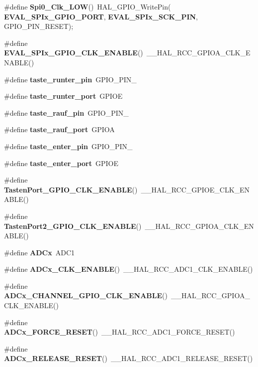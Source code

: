 \begin{DoxyCompactItemize}
\item 
\#define \textbf{ Spi0\+\_\+\+Clk\+\_\+\+L\+OW}()~H\+A\+L\+\_\+\+G\+P\+I\+O\+\_\+\+Write\+Pin(\textbf{ E\+V\+A\+L\+\_\+\+S\+P\+Ix\+\_\+\+G\+P\+I\+O\+\_\+\+P\+O\+RT},\textbf{ E\+V\+A\+L\+\_\+\+S\+P\+Ix\+\_\+\+S\+C\+K\+\_\+\+P\+IN}, G\+P\+I\+O\+\_\+\+P\+I\+N\+\_\+\+R\+E\+S\+ET);
\item 
\#define \textbf{ E\+V\+A\+L\+\_\+\+S\+P\+Ix\+\_\+\+G\+P\+I\+O\+\_\+\+C\+L\+K\+\_\+\+E\+N\+A\+B\+LE}()~\+\_\+\+\_\+\+H\+A\+L\+\_\+\+R\+C\+C\+\_\+\+G\+P\+I\+O\+A\+\_\+\+C\+L\+K\+\_\+\+E\+N\+A\+B\+LE()
\item 
\#define \textbf{ taste\+\_\+runter\+\_\+pin}~G\+P\+I\+O\+\_\+\+P\+I\+N\+\_
\item 
\#define \textbf{ taste\+\_\+runter\+\_\+port}~G\+P\+I\+OE
\item 
\#define \textbf{ taste\+\_\+rauf\+\_\+pin}~G\+P\+I\+O\+\_\+\+P\+I\+N\+\_
\item 
\#define \textbf{ taste\+\_\+rauf\+\_\+port}~G\+P\+I\+OA
\item 
\#define \textbf{ taste\+\_\+enter\+\_\+pin}~G\+P\+I\+O\+\_\+\+P\+I\+N\+\_
\item 
\#define \textbf{ taste\+\_\+enter\+\_\+port}~G\+P\+I\+OE
\item 
\#define \textbf{ Tasten\+Port\+\_\+\+G\+P\+I\+O\+\_\+\+C\+L\+K\+\_\+\+E\+N\+A\+B\+LE}()~\+\_\+\+\_\+\+H\+A\+L\+\_\+\+R\+C\+C\+\_\+\+G\+P\+I\+O\+E\+\_\+\+C\+L\+K\+\_\+\+E\+N\+A\+B\+LE()
\item 
\#define \textbf{ Tasten\+Port2\+\_\+\+G\+P\+I\+O\+\_\+\+C\+L\+K\+\_\+\+E\+N\+A\+B\+LE}()~\+\_\+\+\_\+\+H\+A\+L\+\_\+\+R\+C\+C\+\_\+\+G\+P\+I\+O\+A\+\_\+\+C\+L\+K\+\_\+\+E\+N\+A\+B\+LE()
\item 
\#define \textbf{ A\+D\+Cx}~A\+D\+C1
\item 
\#define \textbf{ A\+D\+Cx\+\_\+\+C\+L\+K\+\_\+\+E\+N\+A\+B\+LE}()~\+\_\+\+\_\+\+H\+A\+L\+\_\+\+R\+C\+C\+\_\+\+A\+D\+C1\+\_\+\+C\+L\+K\+\_\+\+E\+N\+A\+B\+LE()
\item 
\#define \textbf{ A\+D\+Cx\+\_\+\+C\+H\+A\+N\+N\+E\+L\+\_\+\+G\+P\+I\+O\+\_\+\+C\+L\+K\+\_\+\+E\+N\+A\+B\+LE}()~\+\_\+\+\_\+\+H\+A\+L\+\_\+\+R\+C\+C\+\_\+\+G\+P\+I\+O\+A\+\_\+\+C\+L\+K\+\_\+\+E\+N\+A\+B\+LE()
\item 
\#define \textbf{ A\+D\+Cx\+\_\+\+F\+O\+R\+C\+E\+\_\+\+R\+E\+S\+ET}()~\+\_\+\+\_\+\+H\+A\+L\+\_\+\+R\+C\+C\+\_\+\+A\+D\+C1\+\_\+\+F\+O\+R\+C\+E\+\_\+\+R\+E\+S\+ET()
\item 
\#define \textbf{ A\+D\+Cx\+\_\+\+R\+E\+L\+E\+A\+S\+E\+\_\+\+R\+E\+S\+ET}()~\+\_\+\+\_\+\+H\+A\+L\+\_\+\+R\+C\+C\+\_\+\+A\+D\+C1\+\_\+\+R\+E\+L\+E\+A\+S\+E\+\_\+\+R\+E\+S\+ET()

\end{DoxyCompactItemize}
